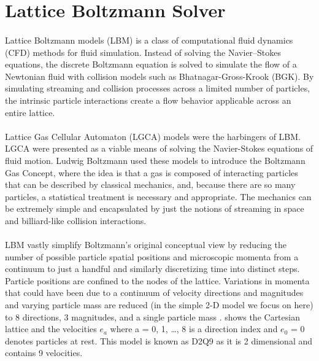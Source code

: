 \section{Lattice Boltzmann Solver}
\label{LBS}

\paragraph{}Lattice Boltzmann models (LBM) is a class of computational fluid dynamics (CFD) methods for fluid simulation. Instead of solving the Navier–Stokes equations, the discrete Boltzmann equation is solved to simulate the flow of a Newtonian fluid with collision models such as Bhatnagar-Gross-Krook (BGK). By simulating streaming and collision processes across a limited number of particles, the intrinsic particle interactions create a flow behavior applicable across an entire lattice.

\paragraph{}Lattice Gas Cellular Automaton (LGCA) models were the harbingers of LBM. LGCA were presented as a viable means of solving the Navier-Stokes equations of fluid motion. Ludwig Boltzmann used these models to introduce the Boltzmann Gas Concept, where the idea is that a gas is composed of interacting particles that can be described by classical mechanics, and, because there are so many particles, a statistical treatment is necessary and appropriate. The mechanics can be extremely simple and encapsulated by just
the notions of streaming in space and billiard-like collision interactions.

\paragraph{}LBM vastly simplify Boltzmann’s original conceptual view by reducing the number of possible particle spatial positions and microscopic momenta from a continuum to just a handful and similarly discretizing time into distinct steps. Particle positions are confined to the nodes of the lattice. Variations in momenta that could have been due to a continuum of velocity directions and magnitudes and varying particle mass are reduced (in the simple 2-D model we focus on here) to 8 directions, 3 magnitudes, and a single particle mass \citep{sukop2006lattice}.  shows the Cartesian lattice and the velocities $e_a$ where a = 0, 1, \dots , 8 is a direction index and $e_0$ = 0 denotes particles at rest. This model is known as D2Q9 as it is 2 dimensional and contains 9 velocities.

